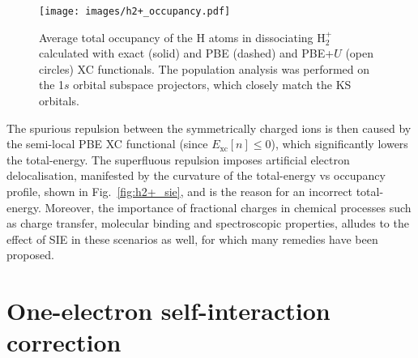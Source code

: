{\begin{figure}[th!]
\centering
\texttt{[image: images/h2+\_occupancy.pdf]}
\caption[Occupancy of H atom in dissociating H$_2^+$]
{Average total occupancy of the H atoms in dissociating H$_2^+$ 
calculated with exact (solid) and PBE (dashed) 
and PBE+$U$ (open circles) XC functionals.
%
The population analysis was performed on the 
1$s$ orbital subspace projectors, 
which closely match the KS orbitals.}
\label{fig:h2+_occ}
\end{figure}
%

The spurious repulsion between the symmetrically charged ions 
is then {caused} by the {semi}-local 
PBE XC functional (since $E_\textrm{xc}[n]\leq 0$),
which significantly lowers the total-energy.
%
The superfluous repulsion 
imposes artificial electron delocalisation, 
manifested by the curvature 
of the total-energy vs occupancy profile, 
shown in Fig.~\ref{fig:h2+_sie}, 
and {is} the reason 
for an incorrect total-energy.
%
%
Moreover, 
the importance of fractional charges 
in chemical processes such as 
charge transfer, molecular binding 
and spectroscopic properties,  
{alludes to} the effect of SIE 
in these scenarios as well,   
for which many remedies 
have been proposed.


\section{One-electron self-interaction correction}
\label{sec:one_electron_sic}

}
